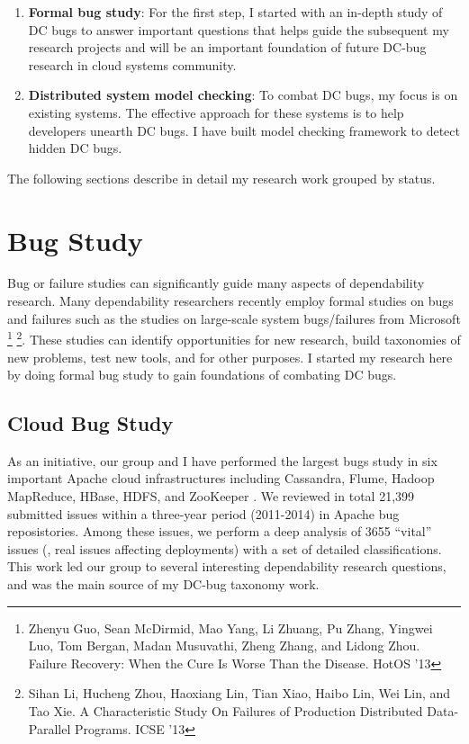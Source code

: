 \documentclass[11pt]{article}
\begin{document}
\begin{enumerate}

\item \textbf{Formal bug study}: For the first step, I started with an in-depth
study of DC bugs to answer important questions that helps guide the subsequent
my research projects and will be an important foundation of future DC-bug
research in cloud systems community.

\item \textbf{Distributed system model checking}: To combat DC bugs, my focus is
on existing systems. The effective approach for these systems is to help
developers unearth DC bugs. I have built model checking framework to detect
hidden DC bugs. 

\end{enumerate}

The following sections describe in detail my research work grouped by status.
\fi

\section{Bug Study}

Bug or failure studies can significantly guide many aspects of dependability
research. Many dependability researchers recently employ formal studies on bugs
and failures such as the studies on large-scale system bugs/failures from
Microsoft \footnote{Zhenyu Guo, Sean McDirmid, Mao Yang, Li Zhuang, Pu Zhang,
Yingwei Luo, Tom Bergan, Madan Musuvathi, Zheng Zhang, and Lidong Zhou. Failure
Recovery: When the Cure Is Worse Than the Disease. HotOS '13} \footnote{Sihan
Li, Hucheng Zhou, Haoxiang Lin, Tian Xiao, Haibo Lin, Wei Lin, and Tao Xie. A
Characteristic Study On Failures of Production Distributed Data-Parallel
Programs. ICSE '13}. These studies can identify opportunities for new research,
build taxonomies of new problems, test new tools, and for other purposes. I
started my research here by doing formal bug study to gain foundations of
combating DC bugs.

\subsection{Cloud Bug Study}

As an initiative, our group and I have performed the largest bugs study in six
important Apache cloud infrastructures including Cassandra, Flume, Hadoop
MapReduce, HBase, HDFS, and ZooKeeper \cite{Gunawi+14-Cbs}. We reviewed in total
21,399 submitted issues within a three-year period (2011-2014) in Apache bug
reposistories. Among these issues, we perform a deep analysis of 3655 ``vital''
issues (\ie, real issues affecting deployments) with a set of detailed
classifications. This work led our group to several interesting dependability
research questions, and was the main source of my DC-bug taxonomy work.
\end{document}
